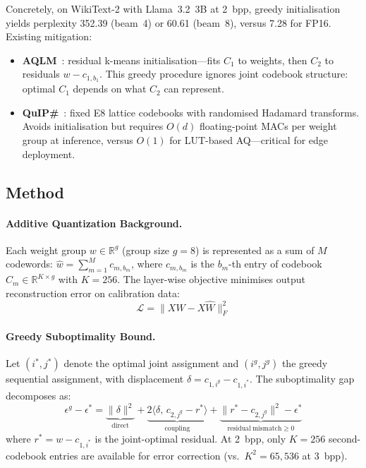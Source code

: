 \documentclass[11pt]{article}
\begin{document}
Concretely, on WikiText-2 with Llama~3.2~3B at 2~bpp, greedy initialisation yields perplexity 352.39 (beam~4) or 60.61 (beam~8), versus 7.28 for FP16. Existing mitigation:

\begin{itemize}
    \item \textbf{AQLM}~\cite{aqlm}: residual k-means initialisation---fits $C_1$ to weights, then $C_2$ to residuals $w - c_{1, b_1}$. This greedy procedure ignores joint codebook structure: optimal $C_1$ depends on what $C_2$ can represent.
    \item \textbf{QuIP\#}~\cite{quipsharp}: fixed E8 lattice codebooks with randomised Hadamard transforms. Avoids initialisation but requires $O(d)$ floating-point MACs per weight group at inference, versus $O(1)$ for LUT-based AQ---critical for edge deployment.
\end{itemize}

\subsection{Method}

\paragraph{Additive Quantization Background.}
Each weight group $w \in \mathbb{R}^{g}$ (group size $g=8$) is represented as a sum of $M$ codewords: $\hat{w} = \sum_{m=1}^{M} c_{m, b_{m}}$, where $c_{m, b_{m}}$ is the $b_m$-th entry of codebook $C_m \in \mathbb{R}^{K \times g}$ with $K = 256$. The layer-wise objective minimises output reconstruction error on calibration data:
\begin{equation}
    \mathcal{L} = \|XW - X\hat{W}\|_{F}^{2}
\end{equation}

\paragraph{Greedy Suboptimality Bound.}
Let $(i^{*}, j^{*})$ denote the optimal joint assignment and $(i^{g}, j^{g})$ the greedy sequential assignment, with displacement $\delta = c_{1, i^{g}} - c_{1, i^{*}}$. The suboptimality gap decomposes as:
\begin{equation}
    \epsilon^{g} - \epsilon^{*} = \underbrace{\|\delta\|^{2}}_{\mathrm{direct}} + \underbrace{2\langle \delta,\, c_{2, j^{g}} - r^{*} \rangle}_{\mathrm{coupling}} + \underbrace{\|r^{*} - c_{2, j^{g}}\|^{2} - \epsilon^{*}}_{\mathrm{residual\ mismatch} \geq 0}
\end{equation}
where $r^{*} = w - c_{1, i^{*}}$ is the joint-optimal residual. At 2~bpp, only $K = 256$ second-codebook entries are available for error correction (vs.\ $K^{2} = 65{,}536$ at 3~bpp).
\end{document}
